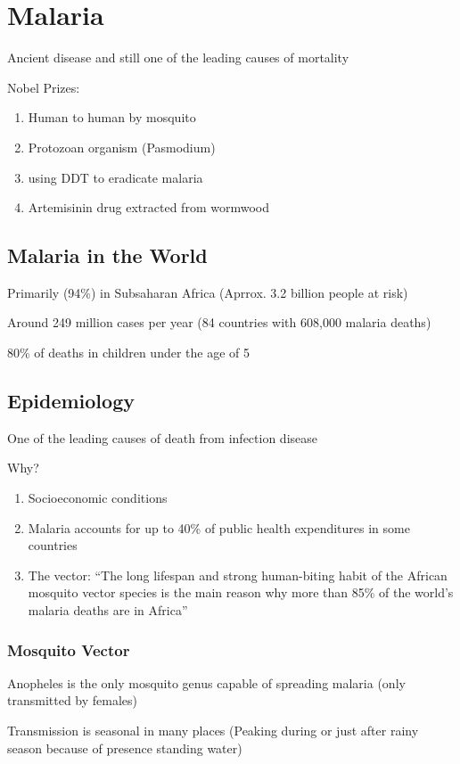 \documentclass{notes}
\begin{document}
\section*{Malaria}
Ancient disease and still one of the leading causes of mortality

Nobel Prizes:
\begin{enumerate}
    \item Human to human by mosquito
    \item Protozoan organism (Pasmodium)
    \item using DDT to eradicate malaria
    \item Artemisinin drug extracted from wormwood
\end{enumerate}

\subsection*{Malaria in the World}
Primarily (94\%) in Subsaharan Africa (Aprrox. 3.2 billion people at risk)

Around 249 million cases per year (84 countries with 608,000 malaria deaths)

80\% of deaths in children under the age of 5

\subsection*{Epidemiology}
One of the leading causes of death from infection disease

Why?
\begin{enumerate}
    \item Socioeconomic conditions
    \item Malaria accounts for up to 40\% of public health expenditures in some countries
    \item The vector: ``The long lifespan and strong human-biting habit of the African mosquito vector species is the main reason why more than 85\% of the world's malaria deaths are in Africa''
\end{enumerate}

\subsubsection*{Mosquito Vector}
Anopheles is the only mosquito genus capable of spreading malaria (only transmitted by females)

Transmission is seasonal in many places (Peaking during or just after rainy season because of presence standing water)
\end{document}
